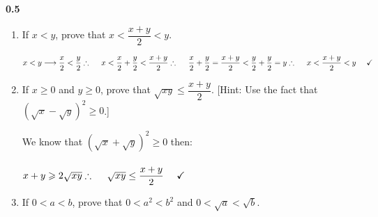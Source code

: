 \documentclass[fleqn]{article}
\begin{document}
  \textbf{0.5}
  \begin{enumerate}
    \item If $x < y$, prove that $x < \dfrac{x+y}{2} < y$.

      \textcolor{hwColor}{
        $
          x<y \longrightarrow \dfrac{x}{2} < \dfrac{y}{2}
          \\
          \\
          \\
          \therefore ~~~~ x<\dfrac{x}{2}+\dfrac{y}{2}<\dfrac{x+y}{2}
          \\
          \\
          \\
          \therefore ~~~~ \dfrac{x}{2}+\dfrac{y}{2}=\dfrac{x+y}{2}<\dfrac{y}{2}+\dfrac{y}{2}=y
          \\
          \\
          \\
          \therefore ~~~~ x < \dfrac{x+y}{2} < y ~~~~ \checkmark
        $
      }

    \item If $x \geq 0$ and $y \geq 0$, prove that $\sqrt{xy} \leq \dfrac{x+y}{2}$. 
    [Hint: Use the fact that $\left(\sqrt{x}-\sqrt{y}\right)^2 \geqslant 0$.]

      \textcolor{hwColor}{
        We know that $\left(\sqrt{x}+\sqrt{y}\right)^2 \geqslant 0$ then:
        \\
        \\
        $
          x+y \geqslant 2\sqrt{xy}
          \\
          \\
          \\
          \therefore ~~~~ \sqrt{xy} \leq \dfrac{x+y}{2} ~~~~ \checkmark
        $
      }

    \item If $0 < a < b$, prove that $0 < a^2 < b^2$ and $0 < \sqrt{a} < \sqrt{b}$.


\end{enumerate}
\end{document}
